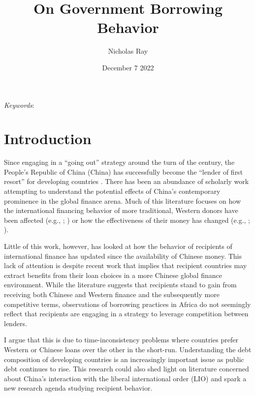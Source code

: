 \documentclass[12pt]{article}
\title{\vspace{-2.75cm}On Government Borrowing Behavior\vspace{-0.5cm}}
\author{Nicholas Ray}
\date{\vspace{-0.30cm}December 7 2022\vspace{-1cm}}
\begin{document}
\maketitle
\begin{abstract}
    
\end{abstract}

\textit{Keywords}: 

\section*{Introduction}
Since engaging in a ``going out'' strategy around the turn of the century, the People's Republic of China (China) has successfully become the ``lender of first resort'' for developing countries \parencite[1]{dreher2022}. There has been an abundance of scholarly work attempting to understand the potential effects of China's contemporary prominence in the global finance arena. Much of this literature focuses on how the international financing behavior of more traditional, Western donors have been affected (e.g., \cite{humphrey2019}; \cite{kilama2016a}) or how the effectiveness of their money has changed (e.g., \cite{blair2022}; \cite{gehring2022}).

Little of this work, however, has looked at how the behavior of recipients of international finance has updated since the availability of Chinese money. This lack of attention is despite recent work that implies that recipient countries may extract benefits from their loan choices in a more Chinese global finance environment. While the literature suggests that recipients stand to gain from receiving both Chinese and Western finance and the subsequently more competitive terms, observations of borrowing practices in Africa do not seemingly reflect that recipients are engaging in a strategy to leverage competition between lenders.

I argue that this is due to time-inconsistency problems where countries prefer Western or Chinese loans over the other in the short-run. Understanding the debt composition of developing countries is an increasingly important issue as public debt continues to rise. This research could also shed light on literature concerned about China's interaction with the liberal international order (LIO) and spark a new research agenda studying recipient behavior.
\end{document}
